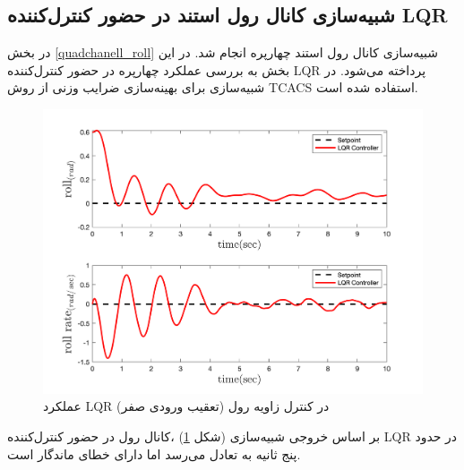 \subsection{شبیه‌سازی کانال رول استند در حضور کنترل‌کننده LQR}\label{roll_lqr_section}
در بخش
\ref{quadchanell_roll}
شبیه‌سازی کانال رول استند چهارپره انجام شد. در این بخش به بررسی عملکرد چهارپره در حضور کنترل‌کننده LQR پرداخته می‌شود. در شبیه‌سازی برای بهینه‌سازی ضرایب وزنی از روش
TCACS \cite{Karimi2010}
استفاده شده است.
\begin{figure}[H]\label{lqr_roll_fig}
	\includegraphics[width=12cm]{../Figures/MIL/LQR/Roll/lqr_roll.png}
	\centering
	\caption{عملكرد LQR در کنترل زاويه رول (تعقیب ورودی صفر)}
\end{figure}
بر اساس خروجی شبیه‌سازی (شکل
\ref{lqr_roll_fig})
،کانال رول در حضور کنترل‌کننده LQR در حدود پنج ثانیه به تعادل می‌رسد اما دارای خطای ماندگار است. 